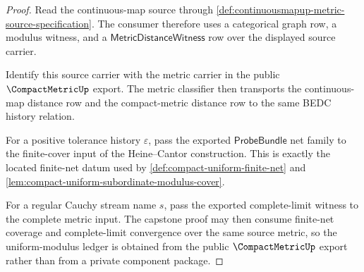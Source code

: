 \begin{proof}
Read the continuous-map source through
\autoref{def:continuousmapup-metric-source-specification}. The consumer
therefore uses a categorical graph row, a modulus witness, and a
$\mathsf{MetricDistanceWitness}$ row over the displayed source carrier.

Identify this source carrier with the metric carrier in the public
$\CompactMetricUp$ export. The metric classifier then transports the
continuous-map distance row and the compact-metric distance row to the same
BEDC history relation.

For a positive tolerance history $\varepsilon$, pass the exported
$\mathsf{ProbeBundle}$ net family to the finite-cover input of the
Heine--Cantor construction. This is exactly the located finite-net datum used
by \autoref{def:compact-uniform-finite-net} and
\autoref{lem:compact-uniform-subordinate-modulus-cover}.

For a regular Cauchy stream name $s$, pass the exported complete-limit witness
to the complete metric input. The capstone proof may then consume finite-net
coverage and complete-limit convergence over the same source metric, so the
uniform-modulus ledger is obtained from the public $\CompactMetricUp$ export
rather than from a private component package.
\end{proof}

